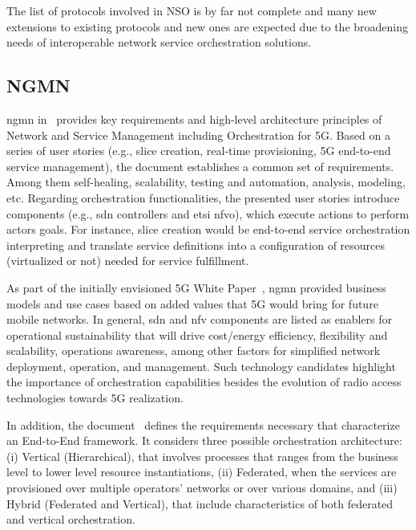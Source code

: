The list of protocols involved in NSO is by far not complete and many new extensions to existing protocols and new ones are expected due to the broadening needs of interoperable network service orchestration solutions.

\subsection{NGMN}
\gls{ngmn} in~\cite{NGMN:5G:2017} provides key requirements and high-level architecture principles of Network and Service Management including Orchestration for 5G. Based on a series of user stories (e.g., slice creation, real-time provisioning, 5G end-to-end service management), the document establishes a common set of requirements. Among them self-healing, scalability, testing and automation, analysis, modeling, etc. Regarding orchestration functionalities, the presented user stories introduce components (e.g., \gls{sdn} controllers and \gls{etsi} \gls{nfvo}), which execute actions to perform actors goals. For instance, slice creation would be end-to-end service orchestration interpreting and translate service definitions into a configuration of resources (virtualized or not) needed for service fulfillment.  

As part of the initially envisioned 5G White Paper~\cite{NGMNAlliance20155GPaper}, \gls{ngmn} provided business models and use cases based on added values that 5G would bring for future mobile networks. In general, \gls{sdn} and \gls{nfv} components are listed as enablers for operational sustainability that will drive cost/energy efficiency, flexibility and scalability, operations awareness, among other factors for simplified network deployment, operation, and management. Such technology candidates highlight the importance of orchestration capabilities besides the evolution of radio access technologies towards 5G realization.

In addition, the document~\cite{NGMNAlliance2018} defines the requirements necessary that characterize an End-to-End framework. It considers three possible orchestration architecture: (i) Vertical (Hierarchical), that involves processes that ranges from the business level to lower level resource instantiations, (ii) Federated, when the services are provisioned over multiple operators’ networks or over various domains, and (iii) Hybrid (Federated and Vertical), that include characteristics of both federated and vertical orchestration.  


